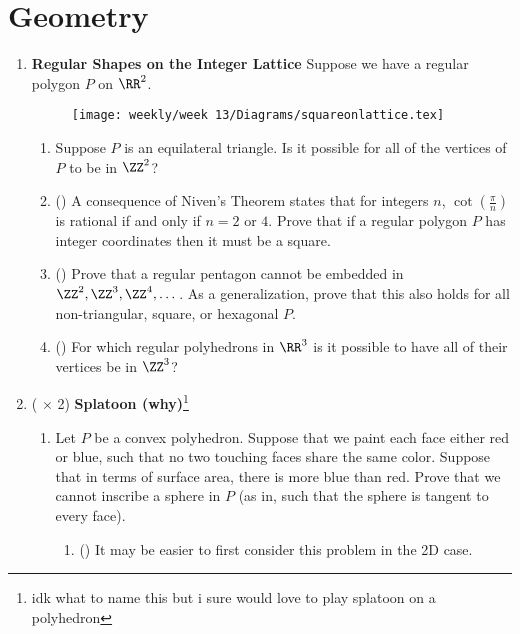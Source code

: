 \documentclass[11pt]{scrartcl}
\begin{document}
\section{Geometry}
\begin{enumerate}[label=\textbf{G\arabic*}.]
    \item \textbf{Regular Shapes on the Integer Lattice} \newline
    Suppose we have a regular polygon $P$ on $\RR^2$.
    
    \begin{figure}[h]
        \centering
        \texttt{[image: weekly/week 13/Diagrams/squareonlattice.tex]}
        \hspace{2em}
        \label{fig:squareonlylattice}
    \end{figure}
    
    \begin{enumerate}
        \item Suppose $P$ is an equilateral triangle. Is it possible for all of the vertices of $P$ to be in $\ZZ^2$?
        
        \item (\fullchili) A consequence of Niven's Theorem states that for integers $n$, $\cot(\frac{\pi}{n})$ is rational if and only if $n = 2$ or $4$. Prove that if a regular polygon $P$ has integer coordinates then it must be a square.
        
        \item (\halfchili) Prove that a regular pentagon cannot be embedded in $\ZZ^2, \ZZ^3, \ZZ^4, \dots$. As a generalization, prove that this also holds for all non-triangular, square, or hexagonal $P$.
        
        \item (\fullchili) For which regular polyhedrons in $\RR^3$ is it possible to have all of their vertices be in $\ZZ^3$?
    \end{enumerate}
    
    \item (\fullchili \hspace{1pt} $\times$ 2) \textbf{Splatoon (why)}\footnote{idk what to name this but i sure would love to play splatoon on a polyhedron}
    
    \begin{enumerate}
        \item Let $P$ be a convex polyhedron. Suppose that we paint each face either red or blue, such that no two touching faces share the same color. Suppose that in terms of surface area, there is more blue than red. Prove that we cannot inscribe a sphere in $P$ (as in, such that the sphere is tangent to every face).
            \begin{enumerate}
                \item (\halfchili) It may be easier to first consider this problem in the 2D case.
            \end{enumerate}
        

\end{enumerate}
\end{enumerate}
\end{document}
